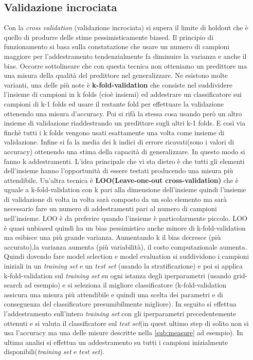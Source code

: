 \subsection{Validazione incrociata}
Con la \textit{cross validation} (validazione incrociata) si supera il limite di holdout che è quello di produrre delle stime pessimisticamente biased. Il principio di funzionamento si basa sulla constatazione che usare un numero di campioni maggiore per l'addestramento tendenzialmente fa diminuire la varianza e anche il bias. Occorre sottolineare che con questa tecnica non otteniamo un predittore ma una misura della qualità del predittore nel generalizzare. Ne esistono molte varianti, una delle più note è \textbf{k-fold-validation} che consiste nel suddividere l'insieme di campioni in k folds (cioè insiemi) ed addestrare un classificatore  sui campioni di k-1 folds ed usare il restante fold per effettuare la validazione ottenendo una misura d'accuracy. Poi si rifà la stessa cosa usando però un altro insieme di validazione riaddestrando un predittore sugli altri k-1 folds. E così via finchè tutti i k folds vengono usati esattamente una volta come insieme di validazione. Infine si fa la media dei k indici di errore ricavati(sono i valori di accuracy)  ottenendo una stima della capacità di generalizzare. In questo modo si fanno k addestramenti. L'idea principale che vi sta dietro è che tutti gli elementi dell'insieme hanno l'opportunità di essere testati producendo una misura più attendibile. Un'altra tecnica è \textbf{LOO(Leave-one-out cross-validation)} che è uguale a k-fold-validation con k pari alla dimensione dell'insieme quindi l'insieme di validazione di volta in volta sarà composto da un solo elemento ma sarà necessario fare un numero di addestramenti pari al numero di campioni nell'insieme. LOO è da preferire quando l'insieme è particolarmente piccolo. LOO è quasi unbiased quindi ha un bias pessimistico anche minore di k-fold-validation ma esibisce una più grande varianza. Aumentando k il bias decresce (più accurato),la varianza aumenta (più variabilità), il costo computazionale aumenta.\\Quindi dovendo fare model selection e model evaluation si suddividono i campioni iniziali in un \textit{training set} e un \textit{test set} (usando la stratificazione) e poi si applica k-fold-validation sul \textit{training set} su ogni istanza degli iperparametri (usando grid-search ad esempio)  e si seleziona il migliore classificatore (k-fold-validation assicura una misura più attendibile e quindi una scelta dei parametri e di conseguenza del classificatore presumibilmente migliore). In seguito si effettua l'addestramento sull'intero \textit{training set} con gli iperparametri precedentemente ottenuti e si valuta il classificatore sul \textit{test set}(in quest ultimo step di solito non si usa l'accuracy ma una delle misure descritte nella \ref{sub:measure} ad esempio). In ultima analisi si effettua un addestramento su tutti i campioni inizialmente disponibili(\textit{training set} e \textit{test set}). 

